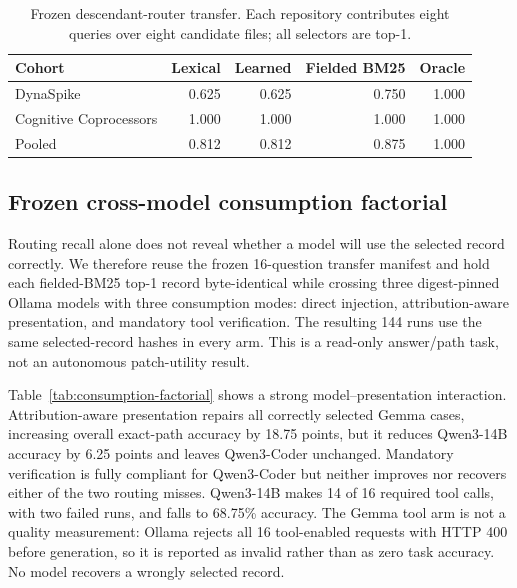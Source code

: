 \documentclass[11pt]{article}
\begin{document}
\begin{table}[H]
\centering
\small
\caption{Frozen descendant-router transfer. Each repository contributes eight
queries over eight candidate files; all selectors are top-1.}
\label{tab:router-transfer}
\begin{tabular}{lrrrr}
\toprule
Cohort & Lexical & Learned & Fielded BM25 & Oracle \\
\midrule
DynaSpike & 0.625 & 0.625 & 0.750 & 1.000 \\
Cognitive Coprocessors & 1.000 & 1.000 & 1.000 & 1.000 \\
Pooled & 0.812 & 0.812 & 0.875 & 1.000 \\
\bottomrule
\end{tabular}
\end{table}

\subsection{Frozen cross-model consumption factorial}

Routing recall alone does not reveal whether a model will use the selected
record correctly. We therefore reuse the frozen 16-question transfer manifest
and hold each fielded-BM25 top-1 record byte-identical while crossing three
digest-pinned Ollama models with three consumption modes: direct injection,
attribution-aware presentation, and mandatory tool verification. The resulting
144 runs use the same selected-record hashes in every arm. This is a read-only
answer/path task, not an autonomous patch-utility result.

Table~\ref{tab:consumption-factorial} shows a strong model--presentation
interaction. Attribution-aware presentation repairs all correctly selected
Gemma cases, increasing overall exact-path accuracy by 18.75 points, but it
reduces Qwen3-14B accuracy by 6.25 points and leaves Qwen3-Coder unchanged.
Mandatory verification is fully compliant for Qwen3-Coder but neither improves
nor recovers either of the two routing misses. Qwen3-14B makes 14 of 16 required
tool calls, with two failed runs, and falls to 68.75\% accuracy. The Gemma tool
arm is not a quality measurement: Ollama rejects all 16 tool-enabled requests
with HTTP 400 before generation, so it is reported as invalid rather than as
zero task accuracy. No model recovers a wrongly selected record.
\end{document}
